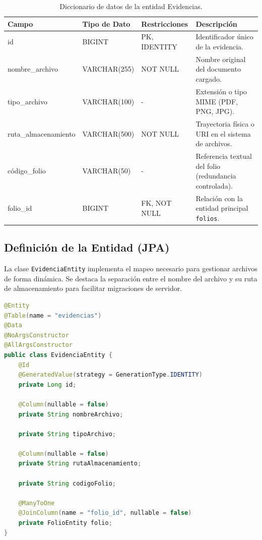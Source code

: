 \begin{table}[H]
\centering
\small
\begin{tabularx}{\textwidth}{|l|l|l|X|}
\hline
\rowcolor{azulESCOM} 
\color{white}\textbf{Campo} & \color{white}\textbf{Tipo de Dato} & \color{white}\textbf{Restricciones} & \color{white}\textbf{Descripci\'on} \\ \hline
id & BIGINT & PK, IDENTITY & Identificador \'unico de la evidencia. \\ \hline
nombre\_archivo & VARCHAR(255) & NOT NULL & Nombre original del documento cargado. \\ \hline
tipo\_archivo & VARCHAR(100) & - & Extensi\'on o tipo MIME (PDF, PNG, JPG). \\ \hline
ruta\_almacenamiento & VARCHAR(500) & NOT NULL & Trayectoria f\'isica o URI en el sistema de archivos. \\ \hline
código\_folio & VARCHAR(50) & - & Referencia textual del folio (redundancia controlada). \\ \hline
folio\_id & BIGINT & FK, NOT NULL & Relaci\'on con la entidad principal \texttt{folios}. \\ \hline
\end{tabularx}
\caption{Diccionario de datos de la entidad Evidencias.}
\label{tab:dict_evidencias}
\end{table}

\subsection{Definici\'on de la Entidad (JPA)}
La clase \texttt{EvidenciaEntity} implementa el mapeo necesario para gestionar archivos de forma din\'amica. Se destaca la separaci\'on entre el nombre del archivo y su ruta de almacenamiento para facilitar migraciones de servidor.

\begin{lstlisting}[language=Java, caption={Entidad Java para la gesti\'on de metadatos de archivos de evidencia.}, label={lst:java_evidencia}]
@Entity
@Table(name = "evidencias")
@Data
@NoArgsConstructor
@AllArgsConstructor
public class EvidenciaEntity {
    @Id
    @GeneratedValue(strategy = GenerationType.IDENTITY)
    private Long id;

    @Column(nullable = false)
    private String nombreArchivo;
    
    private String tipoArchivo; 
    
    @Column(nullable = false)
    private String rutaAlmacenamiento; 
    
    private String codigoFolio;

    @ManyToOne
    @JoinColumn(name = "folio_id", nullable = false)
    private FolioEntity folio;
}
\end{lstlisting}

